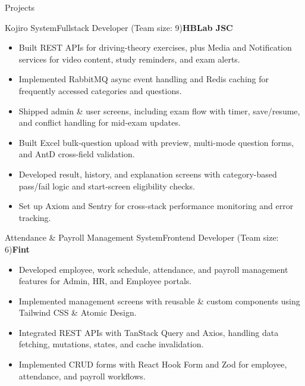\documentclass[]{style}
\newcommand{\bolddate}[1]{\textbf{#1}}
\begin{document}
\begin{section}{Projects}
\newpage
\begin{projectsubsection}{Kojiro System}{Fullstack Developer (Team size: 9)}{\bolddate{HBLab JSC}}{}
\begin{itemize}
  \item Built REST APIs for driving-theory exercises, plus Media and Notification services for video content, study reminders, and exam alerts.
  \item Implemented RabbitMQ async event handling and Redis caching for frequently accessed categories and questions.
  \item Shipped admin \& user screens, including exam flow with timer, save/resume, and conflict handling for mid-exam updates.
  \item Built Excel bulk-question upload with preview, multi-mode question forms, and AntD cross-field validation.
  \item Developed result, history, and explanation screens with category-based pass/fail logic and start-screen eligibility checks.
  \item Set up Axiom and Sentry for cross-stack performance monitoring and error tracking.
\end{itemize}
\end{projectsubsection}


\begin{projectsubsection}{Attendance \& Payroll Management System}{Frontend Developer (Team size: 6)}{\bolddate{Fint}}{}
\begin{itemize}
  \item Developed employee, work schedule, attendance, and payroll management features for Admin, HR, and Employee portals.
  \item Implemented management screens with reusable \& custom components using Tailwind CSS \& Atomic Design.
  \item Integrated REST APIs with TanStack Query and Axios, handling data fetching, mutations, states, and cache invalidation.
  \item Implemented CRUD forms with React Hook Form and Zod for employee, attendance, and payroll workflows.
\end{itemize}
\end{projectsubsection}
 

\end{section}
\end{document}
